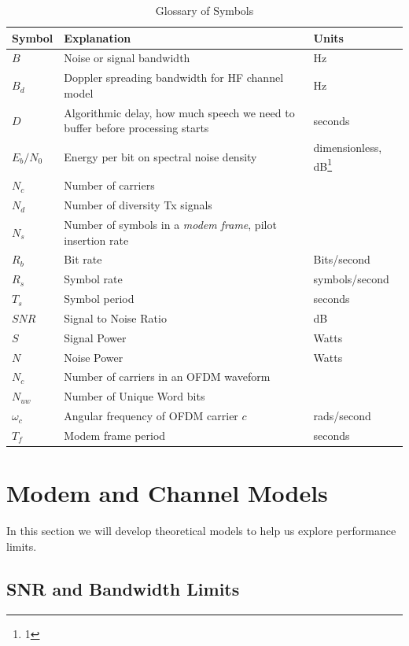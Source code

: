 \documentclass{article}
\begin{document}
\begin{table}[H]
\centering
\begin{tabular}{l m{6cm} l}
 \hline
 Symbol & Explanation & Units \\
 \hline
 $B$ & Noise or signal bandwidth & Hz \\
 $B_d$ & Doppler spreading bandwidth for HF channel model & Hz \\
 $D$ & Algorithmic delay, how much speech we need to buffer before processing starts & seconds \\
 $E_b/N_0$ & Energy per bit on spectral noise density & dimensionless, dB\footnote{1} \\
 $N_c$ & Number of carriers  \\
 $N_d$ & Number of diversity Tx signals  \\
 $N_s$ & Number of symbols in a \emph{modem frame}, pilot insertion rate  \\
 $R_b$ & Bit rate & Bits/second \\
 $R_s$ & Symbol rate & symbols/second \\
 $T_s$ & Symbol period & seconds \\
 $SNR$ & Signal to Noise Ratio & dB \\
 $S$ & Signal Power & Watts \\
 $N$ & Noise Power & Watts \\
 $N_c$ & Number of carriers in an OFDM waveform \\
 $N_{uw}$ & Number of Unique Word bits \\
 $\omega_c$ & Angular frequency of OFDM carrier $c$ & rads/second \\ 
 $T_f$ & Modem frame period & seconds \\
 \hline
\end{tabular}
\caption{Glossary of Symbols}
\end{table}


\clearpage

\section{Modem and Channel Models}

In this section we will develop theoretical models to help us explore performance limits.

\subsection{SNR and Bandwidth Limits}
\end{document}
